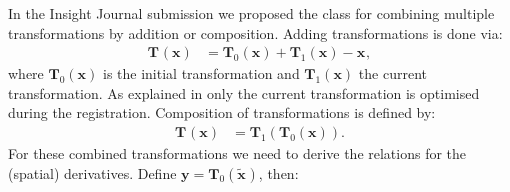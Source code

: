 \documentclass{InsightArticle}
\newcommand{\vT}{\bm{T}}
\newcommand{\vTx}[1][]{\bm{T}_{#1}(\bm{x})}
\newcommand{\vx}[1][]{\bm{x}_{#1}}
\newcommand{\vxt}[1][]{\bm{\widetilde x}_{#1}}
\begin{document}
In the Insight Journal submission \cite{Klein06} we proposed the
class  for combining multiple
transformations by addition or composition. Adding transformations
is done via:
\begin{align}
\vTx &= \vTx[0] + \vTx[1] - \vx,\label{eq:Tadd}
\end{align}
where $\vTx[0]$ is the initial transformation and $\vTx[1]$ the
current transformation. As explained in \cite{Klein06} only the
current transformation is optimised during the registration.
Composition of transformations is defined by:
\begin{align}
\vTx &= \vT_1(\vTx[0]).\label{eq:Tcompose}
\end{align}
For these combined transformations we need to derive the relations
for the (spatial) derivatives. Define $\bm{y} = \vT_0(\vxt)$, then:
\end{document}
